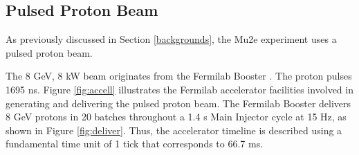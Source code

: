 \subsection{Pulsed Proton Beam}\label{pulsedprotonbeam}
As previously discussed in Section  \ref{backgrounds}, the Mu2e experiment uses a 
pulsed proton beam.

The 8 GeV, 8 kW beam originates from the Fermilab Booster \cite{PhysRevAccelBeams.20.111003}. 
The  proton pulses  1695 ns. Figure \ref{fig:accell} 
illustrates the Fermilab accelerator facilities involved in generating and delivering 
the pulsed proton beam. The Fermilab Booster delivers 8 GeV protons in 20 batches 
throughout a 1.4 s Main Injector cycle at 15 Hz, as shown in Figure \ref{fig:deliver}. 
Thus, the accelerator timeline is described using a fundamental time unit of 1 tick that corresponds to 66.7 ms.

